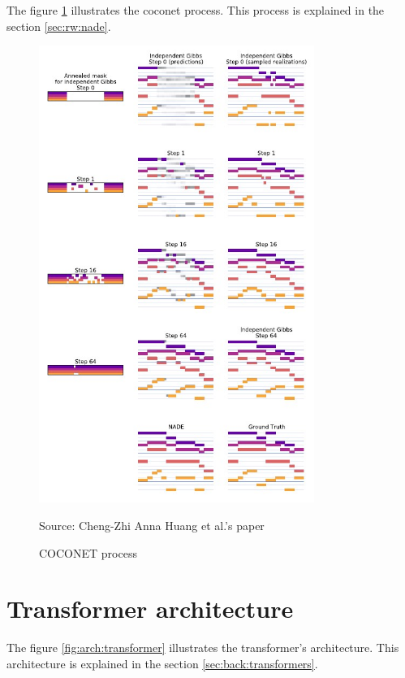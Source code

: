 \documentclass[12pt]{report}
\begin{document}
The figure \ref{fig:coconet_process} illustrates the coconet process.
This process is explained in the section \ref{sec:rw:nade}.

\begin{figure}[htbp]
    \centering
    \includegraphics[width=0.8\textwidth]{images/related_works/coconet/coconet_process.jpg}
    \caption{COCONET process}
    Source: Cheng-Zhi Anna Huang et al.'s paper \cite{huang_counterpoint_2017}
    \label{fig:coconet_process}
\end{figure}

\section{Transformer architecture}

The figure \ref{fig:arch:transformer} illustrates the transformer's architecture. This architecture is explained in the section \ref{sec:back:transformers}.
\end{document}

